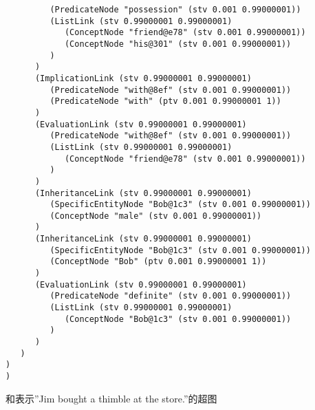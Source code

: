{\begin{tiny}
\begin{lstlisting}
         (PredicateNode "possession" (stv 0.001 0.99000001))
         (ListLink (stv 0.99000001 0.99000001)
            (ConceptNode "friend@e78" (stv 0.001 0.99000001))
            (ConceptNode "his@301" (stv 0.001 0.99000001))
         )
      )
      (ImplicationLink (stv 0.99000001 0.99000001)
         (PredicateNode "with@8ef" (stv 0.001 0.99000001))
         (PredicateNode "with" (ptv 0.001 0.99000001 1))
      )
      (EvaluationLink (stv 0.99000001 0.99000001)
         (PredicateNode "with@8ef" (stv 0.001 0.99000001))
         (ListLink (stv 0.99000001 0.99000001)
            (ConceptNode "friend@e78" (stv 0.001 0.99000001))
         )
      )
      (InheritanceLink (stv 0.99000001 0.99000001)
         (SpecificEntityNode "Bob@1c3" (stv 0.001 0.99000001))
         (ConceptNode "male" (stv 0.001 0.99000001))
      )
      (InheritanceLink (stv 0.99000001 0.99000001)
         (SpecificEntityNode "Bob@1c3" (stv 0.001 0.99000001))
         (ConceptNode "Bob" (ptv 0.001 0.99000001 1))
      )
      (EvaluationLink (stv 0.99000001 0.99000001)
         (PredicateNode "definite" (stv 0.001 0.99000001))
         (ListLink (stv 0.99000001 0.99000001)
            (ConceptNode "Bob@1c3" (stv 0.001 0.99000001))
         )
      )
   )
)
)

\end{lstlisting}\end{tiny}}

和表示”Jim bought a thimble at the store.”的超图

